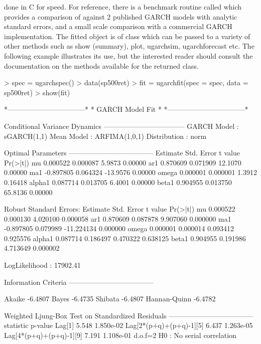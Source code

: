 done in C for speed. For reference, there is a benchmark routine called \verb@ugarchbench@
which provides a comparison of \verb@rugarch@ against 2 published GARCH models with analytic
standard errors, and a small scale comparison with a commercial GARCH implementation.
The fitted object is of class \verb@uGARCHfit@ which can be passed to a variety
of other methods such as show (summary), plot, ugarchsim, ugarchforecast etc.
The following example illustrates its use, but the interested reader should
consult the documentation on the methods available for the returned class.
\begin{Schunk}
\begin{Sinput}
> spec = ugarchspec()
> data(sp500ret)
> fit = ugarchfit(spec = spec, data = sp500ret)
> show(fit)
\end{Sinput}
\begin{Soutput}
*---------------------------------*
*          GARCH Model Fit        *
*---------------------------------*

Conditional Variance Dynamics 	
-----------------------------------
GARCH Model	: sGARCH(1,1)
Mean Model	: ARFIMA(1,0,1)
Distribution	: norm

Optimal Parameters
------------------------------------
        Estimate  Std. Error  t value Pr(>|t|)
mu      0.000522    0.000087   5.9873  0.00000
ar1     0.870609    0.071909  12.1070  0.00000
ma1    -0.897805    0.064324 -13.9576  0.00000
omega   0.000001    0.000001   1.3912  0.16418
alpha1  0.087714    0.013705   6.4001  0.00000
beta1   0.904955    0.013750  65.8136  0.00000

Robust Standard Errors:
        Estimate  Std. Error    t value Pr(>|t|)
mu      0.000522    0.000130   4.020100 0.000058
ar1     0.870609    0.087878   9.907060 0.000000
ma1    -0.897805    0.079989 -11.224134 0.000000
omega   0.000001    0.000014   0.093412 0.925576
alpha1  0.087714    0.186497   0.470322 0.638125
beta1   0.904955    0.191986   4.713649 0.000002

LogLikelihood : 17902.41

Information Criteria
------------------------------------

Akaike       -6.4807
Bayes        -6.4735
Shibata      -6.4807
Hannan-Quinn -6.4782

Weighted Ljung-Box Test on Standardized Residuals
------------------------------------
                        statistic   p-value
Lag[1]                      5.548 1.850e-02
Lag[2*(p+q)+(p+q)-1][5]     6.437 1.263e-05
Lag[4*(p+q)+(p+q)-1][9]     7.191 1.108e-01
d.o.f=2
H0 : No serial correlation


\end{Soutput}
\end{Schunk}
